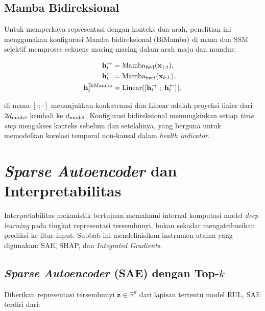\subsection{Mamba Bidireksional}
\label{subsec:bab3_bimamba}

Untuk memperkaya representasi dengan konteks dua arah, penelitian ini
menggunakan konfigurasi Mamba bidireksional (BiMamba) di mana dua SSM selektif
memproses sekuens masing-masing dalam arah maju dan mundur:

\begin{align}
  \mathbf{h}^{\rightarrow}_t &= \text{Mamba}_{\rm fwd}(\mathbf{x}_{1:t}),
    \label{eq:bab3_bimamba_fwd} \\
  \mathbf{h}^{\leftarrow}_t &= \text{Mamba}_{\rm bwd}(\mathbf{x}_{t:L}),
    \label{eq:bab3_bimamba_bwd} \\
  \mathbf{h}^{\rm BiMamba}_t &= \text{Linear}([\mathbf{h}^{\rightarrow}_t \;
    ; \; \mathbf{h}^{\leftarrow}_t]),
    \label{eq:bab3_bimamba_fused}
\end{align}

\noindent di mana $[\cdot ; \cdot]$ menunjukkan konkatenasi dan $\text{Linear}$
adalah proyeksi linier dari $2d_{\rm model}$ kembali ke $d_{\rm model}$.
Konfigurasi bidireksional memungkinkan setiap \emph{time step} mengakses
konteks sebelum dan setelahnya, yang berguna untuk memodelkan korelasi
temporal non-kausal dalam \emph{health indicator}.

\section{\emph{Sparse Autoencoder} dan Interpretabilitas}
\label{sec:bab3_sae_interpretabilitas}

Interpretabilitas mekanistik bertujuan memahami internal komputasi model
\emph{deep learning} pada tingkat representasi tersembunyi, bukan sekadar
mengatribusikan prediksi ke fitur input. Subbab ini mendefinisikan instrumen
utama yang digunakan: SAE, SHAP, dan \emph{Integrated Gradients}.

\subsection{\emph{Sparse Autoencoder} (SAE) dengan Top-\texorpdfstring{$k$}{k}}
\label{subsec:bab3_sae}

Diberikan representasi tersembunyi $\mathbf{z} \in \mathbb{R}^d$ dari
lapisan tertentu model RUL, SAE terdiri dari:

